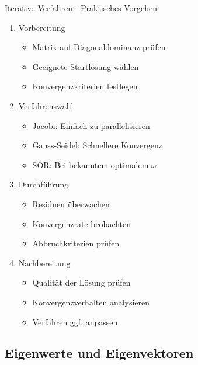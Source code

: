 \begin{KR}{Iterative Verfahren - Praktisches Vorgehen}
\begin{enumerate}
    \item Vorbereitung
    \begin{itemize}
        \item Matrix auf Diagonaldominanz prüfen
        \item Geeignete Startlösung wählen
        \item Konvergenzkriterien festlegen
    \end{itemize}
    
    \item Verfahrenswahl
    \begin{itemize}
        \item Jacobi: Einfach zu parallelisieren
        \item Gauss-Seidel: Schnellere Konvergenz
        \item SOR: Bei bekanntem optimalem $\omega$
    \end{itemize}
    
    \item Durchführung
    \begin{itemize}
        \item Residuen überwachen
        \item Konvergenzrate beobachten
        \item Abbruchkriterien prüfen
    \end{itemize}
    
    \item Nachbereitung
    \begin{itemize}
        \item Qualität der Lösung prüfen
        \item Konvergenzverhalten analysieren
        \item Verfahren ggf. anpassen
    \end{itemize}
\end{enumerate}
\end{KR}

\subsection{Eigenwerte und Eigenvektoren}

